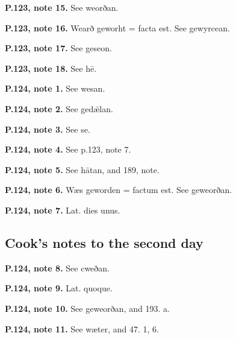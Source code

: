\textbf{P.123, note 15.} See weorðan.

\textbf{P.123, note 16.} Wearð geworht = facta est. See gewyrcean.

\textbf{P.123, note 17.} See geseon.

\textbf{P.123, note 18.} See hē.

\textbf{P.124, note 1.} See wesan.

\textbf{P.124, note 2.} See gedǣlan.

\textbf{P.124, note 3.} See se.

\textbf{P.124, note 4.} See p.123, note 7.

\textbf{P.124, note 5.} See hātan, and 189, note.

\textbf{P.124, note 6.} Wæs geworden = factum est. See geweorðan.

\textbf{P.124, note 7.} Lat. dies unus.

\subsection*{Cook’s notes to the second day}

\textbf{P.124, note 8.} See cweðan.

\textbf{P.124, note 9.} Lat. quoque.

\textbf{P.124, note 10.} See geweorðan, and 193. a.

\textbf{P.124, note 11.} See wæter, and 47. 1, 6.

